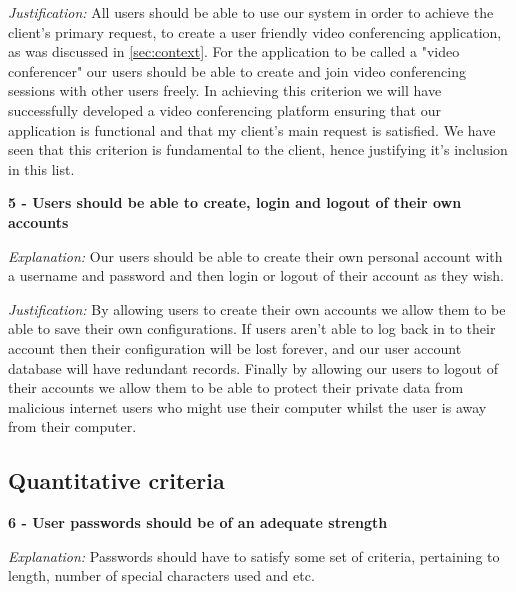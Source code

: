 \vspace{0.1cm}

\textit{Justification:}
All users should be able to use our system in order to
achieve the client's primary request, to create a user
friendly video conferencing application, as was discussed
in \ref{sec:context}. For the application to be called a
"video conferencer" our users should be able to create and
join video conferencing sessions with other users freely.
In achieving this criterion we will have successfully
developed a video conferencing platform ensuring that our
application is functional and that my client's main request
is satisfied. We have seen that this criterion is fundamental
to the client, hence justifying it's inclusion in this list.\\
\vspace{0.2cm}

\textsf{\bfseries 5 - Users should be able to create, login and
logout of their own accounts}

\vspace{0.1cm}

\textit{Explanation:}
Our users should be able to create their
own personal account with a username and password and then
login or logout of their account as they wish.

\vspace{0.1cm}

\textit{Justification:}
By allowing users to create their own accounts we allow
them to be able to save their own configurations. If users
aren't able to log back in to their account then their
configuration will be lost forever, and our user account
database will have redundant records. Finally by allowing
our users to logout of their accounts we allow them to be
able to protect their private data from malicious internet
users who might use their computer whilst the user is away
from their computer. \\

\subsection{Quantitative criteria}

\textsf{\bfseries 6 - User passwords should be of an adequate strength}

\vspace{0.1cm}

\textit{Explanation:} Passwords should have to satisfy some
set of criteria, pertaining to length, number of special
characters used and etc.

